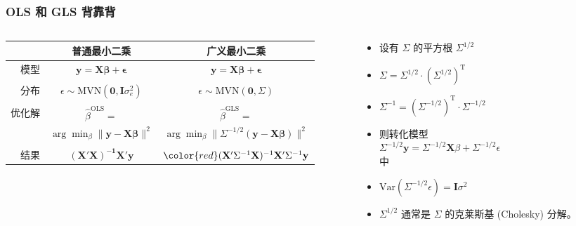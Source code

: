 \documentclass[serif,aspectratio=169]{beamer}
\begin{document}
\begin{frame}
  \frametitle{OLS 和 GLS 背靠背}
  \begin{columns}
    \begin{column}{.62\textwidth}
      \centering
      \begin{tabular}{rcc}
        & 普通最小二乘 & 广义最小二乘\\\hline
        模型 & $\mathbf{y=X\beta +\epsilon}$ & $\mathbf{y = X\beta +\epsilon}$\\\\
        分布 & $\epsilon\sim\mathrm{MVN}(\mathbf{0}, \mathbf{I}\sigma_e^2)$ & $\epsilon\sim\mathrm{MVN}(\mathbf{0}, \Sigma)$\\\\
        优化解 & $\hat{\beta}^{\mathrm{OLS}} = $ &  $\hat{\beta}^{\mathrm{GLS}}=$\\
        & $\displaystyle\arg\min_{\beta}\|\mathbf{y-X\beta}\|^2$ & $\displaystyle\arg\min_{\beta}\|\Sigma^{-1/2}(\mathbf{y-X\beta})\|^2$\\\\ 
        结果 & $\mathbf{(X'X)^{-1}X'y}$ & ${\color{red}(\mathbf{X}'\Sigma^{-1}\mathbf{X})^{-1}\mathbf{X}'\Sigma^{-1}\mathbf{y}}$
      \end{tabular}
    \end{column}
      
    \begin{column}{.38\textwidth}
      \begin{itemize}
      \item 设有 $\Sigma$ 的平方根 $\Sigma^{1/2}$
      \item $\Sigma = \Sigma^{1/2}\cdot(\Sigma^{1/2})^{\mathrm{T}}$
      \item $\Sigma^{-1} = (\Sigma^{-1/2})^{\mathrm{T}}\cdot\Sigma^{-1/2}$
      \item 则转化模型\\
        $\Sigma^{-1/2}\mathbf{y}=\Sigma^{-1/2}\mathbf{X}\beta+\Sigma^{-1/2}\epsilon$\\
        中
      \item $\mathrm{Var}(\Sigma^{-1/2}\epsilon) = \mathbf{I}\sigma^2$
      \item {}$\Sigma^{1/2}$ 通常是 $\Sigma$ 的克莱斯基 (Cholesky) 分解。
      \end{itemize}
      
    \end{column}
  \end{columns}
\end{frame}
\end{document}
